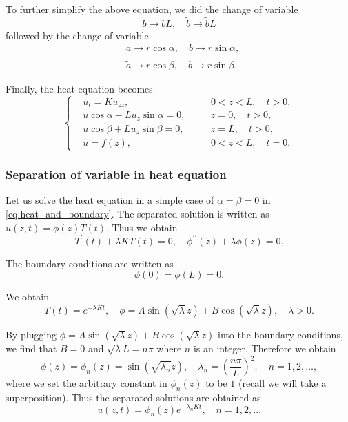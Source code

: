 To further simplify the above equation, we did the change of variable 
\begin{equation}
    b\rightarrow bL,\quad \widetilde{b}\rightarrow \widetilde{b}L
\end{equation}
followed by the change of variable
\begin{equation}
    \begin{split}
        &a\rightarrow r\cos \alpha,\quad b\rightarrow r\sin \alpha,
        \\
        &\widetilde{a}\rightarrow r\cos \beta,\quad \widetilde{b}\rightarrow r\sin \beta.
    \end{split}
\end{equation}

Finally, the heat equation becomes
\begin{equation}\label{eq.heat_and_boundary}
    \left\{\begin{aligned} 
        &u_t=K u_{z z}, && 0<z<L, \quad t>0, 
        \\ 
        &u \cos \alpha-L u_z \sin \alpha=0,\quad && z=0, \quad t>0, 
        \\ 
        &u \cos \beta+L u_z \sin \beta=0, && z=L, \quad t>0, 
        \\
        &u=f(z), && 0<z<L, \quad t=0,
    \end{aligned}\right.
\end{equation}


\subsubsection{Separation of variable in heat equation}

Let us solve the heat equation in a simple case of $\alpha=\beta=0$ in \eqref{eq.heat_and_boundary}. The separated solution is written as $u(z, t)=\phi(z) T(t)$. Thus we obtain
$$
T^{\prime}(t)+\lambda K T(t)=0, \quad \phi^{\prime \prime}(z)+\lambda \phi(z)=0 .
$$

The boundary conditions are written as
$$
\phi(0)=\phi(L)=0 .
$$

We obtain
$$
T(t)=e^{-\lambda K t}, \quad \phi=A \sin (\sqrt{\lambda} z)+B \cos (\sqrt{\lambda} z), \quad \lambda>0 .
$$

By plugging $\phi=A \sin (\sqrt{\lambda} z)+B \cos (\sqrt{\lambda} z)$ into the boundary conditions, we find that $B=0$ and $\sqrt{\lambda} L = n\pi$ where $n$ is an integer. Therefore we obtain
$$
\phi(z)=\phi_n(z)=\sin \left(\sqrt{\lambda_n} z\right), \quad \lambda_n=\left(\frac{n \pi}{L}\right)^2, \quad n=1,2, \ldots,
$$
where we set the arbitrary constant in $\phi_n(z)$ to be $1$ (recall we will take a superposition). Thus the separated solutions are obtained as
$$
u(z, t)=\phi_n(z) e^{-\lambda_n K t}, \quad n=1,2, \ldots
$$

